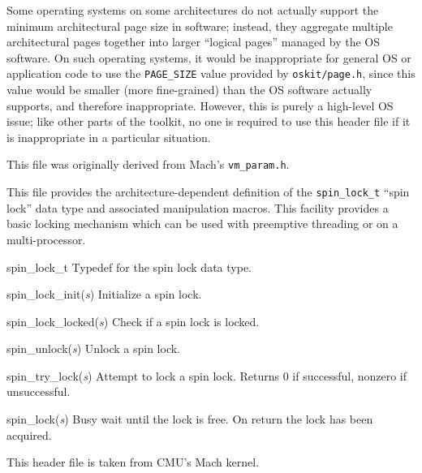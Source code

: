 \begin{apidesc}

	Some operating systems on some architectures
	do not actually support the minimum architectural page size in software;
	instead, they aggregate multiple architectural pages together
	into larger ``logical pages'' managed by the OS software.
	On such operating systems,
	it would be inappropriate for general OS or application code
	to use the {\tt PAGE_SIZE} value provided by {\tt oskit/page.h},
	since this value would be smaller (more fine-grained)
	than the OS software actually supports, and therefore inappropriate.
	However, this is purely a high-level OS issue;
	like other parts of the toolkit,
	no one is required to use this header file
	if it is inappropriate in a particular situation.

	This file was originally derived from Mach's {\tt vm_param.h}.
\end{apidesc}


\begin{apisyn}
\end{apisyn}
\begin{apidesc}
	This file provides the architecture-dependent definition of the
	{\tt spin_lock_t} ``spin lock'' data type and
	associated manipulation macros.
	This facility provides a basic locking mechanism which can be
	used with preemptive threading or on a multi-processor.

	\begin{csymlist}
	\item[spin_lock_t]	
		Typedef for the spin lock data type.
	\item[spin_lock_init(\emph{s})]	
		Initialize a spin lock.
	\item[spin_lock_locked(\emph{s})] 
		Check if a spin lock is locked.
	\item[spin_unlock(\emph{s})]	
		Unlock a spin lock.
	\item[spin_try_lock(\emph{s})] 	
		Attempt to lock a spin lock.  Returns 0 if successful,
		nonzero if unsuccessful.
	\item[spin_lock(\emph{s})]	
		Busy wait until the lock is free.  On return the lock
		has been acquired.
	\end{csymlist}

	This header file is taken from CMU's Mach kernel.
\end{apidesc}

